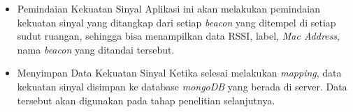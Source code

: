 \begin {itemize}
\itemsep0em
\item Pemindaian Kekuatan Sinyal \newline
Aplikasi ini akan melakukan pemindaian kekuatan sinyal yang ditangkap dari setiap \textit{beacon} yang ditempel di setiap sudut ruangan, sehingga bisa menampilkan data RSSI, label, \textit{Mac Address}, nama \textit{beacon} yang ditandai tersebut.

\item Menyimpan Data Kekuatan Sinyal \newline
Ketika selesai melakukan \textit{mapping}, data kekuatan sinyal disimpan ke database \textit{mongoDB} yang berada di server. Data tersebut akan digunakan pada tahap penelitian selanjutnya.
\end{itemize}


